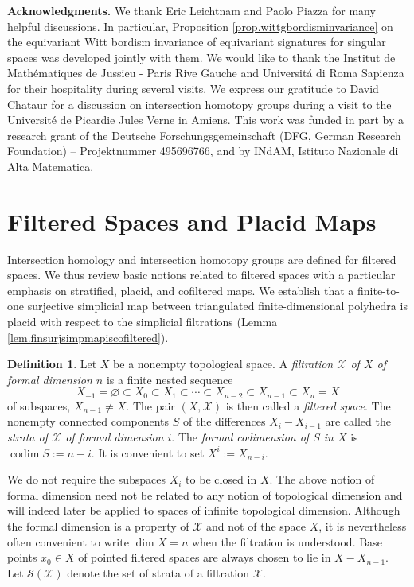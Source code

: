 \documentclass{amsart}
\theoremstyle{definition}
\newtheorem{defn}[thm]{Definition}
\theoremstyle{remark}
\newcommand {\Sa}    {\ensuremath{\mbox{$\mathcal{S}$}}}
\newcommand {\Xa}    {\ensuremath{\mathcal{X}}}
\newcommand {\codim} {\ensuremath{\operatorname{codim}}}
\begin{document}
\textbf{Acknowledgments.}
We thank Eric Leichtnam and Paolo Piazza for many helpful discussions.
In particular, Proposition \ref{prop.wittgbordisminvariance} on 
the equivariant Witt bordism invariance of equivariant signatures for
singular spaces was developed jointly with them. We would like to thank
the Institut de Math\'ematiques de Jussieu - Paris Rive Gauche
and Universit\'a di Roma Sapienza for their hospitality during several visits.
We express our gratitude to David Chataur for a discussion on intersection
homotopy groups during a visit to the  
Université de Picardie Jules Verne in Amiens.
This work was funded in part by a research grant of the
 Deutsche Forschungsgemeinschaft (DFG, German Research Foundation)
 -- Projektnummer 495696766, and
by INdAM, Istituto Nazionale di Alta Matematica.



\section{Filtered Spaces and Placid Maps}
\label{sec.filteredspaces}

Intersection homology and intersection homotopy groups are
defined for filtered spaces. We thus review basic notions
related to filtered spaces with a particular emphasis on
stratified, placid, and cofiltered maps.
We establish that
a finite-to-one surjective simplicial map between triangulated 
finite-dimensional polyhedra
is placid with respect to the simplicial filtrations
(Lemma \ref{lem.finsurjsimpmapiscofiltered}).

\begin{defn}
Let $X$ be a nonempty topological space. 
A \emph{filtration $\Xa$ of $X$ of formal dimension $n$} is a finite
nested sequence
\[ X_{-1} = \varnothing \subset X_0 \subset X_1 \subset
\cdots \subset X_{n-2} \subset X_{n-1} \subset X_n =X \]
of subspaces, $X_{n-1} \not= X$.
The pair $(X,\Xa)$ is then called a \emph{filtered space}.
The nonempty connected components $S$ of the differences $X_i - X_{i-1}$ are called
the \emph{strata of $\Xa$ of formal dimension $i$}.
The \emph{formal codimension of $S$ in $X$} is
$\codim S := n-i$. It is convenient to set $X^i := X_{n-i}$.
\end{defn}
We do not require the subspaces $X_i$ to be closed in $X$.
The above notion of formal dimension need not be related to any
notion of topological dimension and will indeed later be applied to
spaces of infinite topological dimension. Although the formal dimension
is a property of $\Xa$ and not of the space $X$, it is nevertheless
often convenient to write $\dim X=n$ when the filtration is understood.
Base points $x_0 \in X$ of pointed filtered spaces are always
chosen to lie in $X - X_{n-1}$.
Let $\Sa (\Xa)$ denote the set of strata of a filtration $\Xa$.
\end{document}
